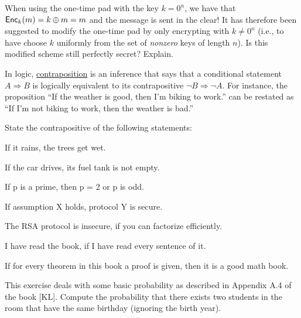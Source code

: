 \documentclass[a4paper,10pt,landscape,twocolumn]{scrartcl}
\begin{document}
\begin{exercise}
When using the one-time pad with the key $k=0^n$, we have that $\mathsf{Enc}_k(m)=k \oplus m = m$ and the message is sent in the clear! It has therefore been suggested to modify the one-time pad by only encrypting with $k \neq 0^n$ (i.e., to have \gen choose $k$ uniformly from the set of \emph{nonzero} keys of length $n$). Is this modified scheme still perfectly secret? Explain.
\end{exercise}

\enlargethispage{2cm}
\begin{exercise}
In logic, \href{https://en.wikipedia.org/wiki/Contraposition}{contraposition} is an inference that says that a conditional statement $A \Rightarrow B$ is logically equivalent to its contrapositive $\neg B \Rightarrow \neg A$. For instance, the proposition ``If the weather is good, then I'm biking to work.'' can be restated as ``If I'm not biking to work, then the weather is bad.''

State the contrapositive of the following statements:
\begin{subex}
If it rains, the trees get wet.
\end{subex}
\begin{subex}
If the car drives, its fuel tank is not empty.
\end{subex}
\begin{subex}
If p is a prime, then p = 2 or p is odd.
\end{subex}
\begin{subex}
If assumption X holds, protocol Y is secure.
\end{subex}
\begin{subex}
The RSA protocol is insecure, if you can factorize efficiently.
\end{subex}
\begin{subex}
I have read the book, if I have read every sentence of it.
\end{subex}
\begin{subex}
If for every theorem in this book a proof is given, then it is a
good math book.
\end{subex}
\end{exercise}


\begin{exercise}
This exercise deals with some basic probability as described in Appendix A.4 of the book [KL]. Compute the probability that there exists two students in the room that have the same birthday (ignoring the birth year).
\end{exercise}
\end{document}
